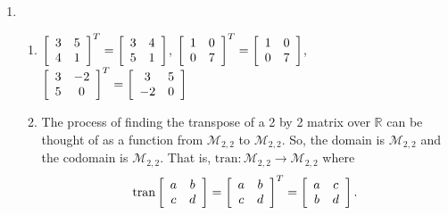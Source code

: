 \begin{enumerate}
\item \begin{enumerate}
\item $\left[ {\begin{array}{*{20}c}
   3 & 5  \\
   4 & 1  \\
\end{array} } \right]^T =  \left[ {\begin{array}{*{20}c}
   3 & 4  \\
   5 & 1  \\
\end{array} } \right]$, \qquad
$\left[ {\begin{array}{*{20}c}
   1 & 0  \\
   0 & 7  \\
\end{array} } \right]^T =  \left[ {\begin{array}{*{20}c}
   1 & 0  \\
   0 & 7  \\
\end{array} } \right]$, \\
$\left[ {\begin{array}{*{20}c}
   3 & -2  \\
   5 & 0  \\
\end{array} } \right]^T =  \left[ {\begin{array}{*{20}c}
   3 & 5  \\
   -2 & 0  \\
\end{array} } \right]$

\item The process of finding the transpose of a 2 by 2 matrix over $\mathbb{R}$ can be thought of as a function from $\mathcal{M}_{2, 2}$ to $\mathcal{M}_{2, 2}$.  So, the domain is 
$\mathcal{M}_{2, 2}$ and the codomain is $\mathcal{M}_{2, 2}$.  That is, 
$\text{tran} : \mathcal{M}_{2, 2} \to \mathcal{M}_{2, 2}$ where
\[
\text{tran}\left[ {\begin{array}{*{20}c}
   a & b  \\
   c & d  \\
\end{array} } \right] = \left[ {\begin{array}{*{20}c}
   a & b  \\
   c & d  \\
\end{array} } \right]^T = \left[ {\begin{array}{*{20}c}
   a & c  \\
   b & d  \\
\end{array} } \right].
\]
\end{enumerate}
\end{enumerate}




